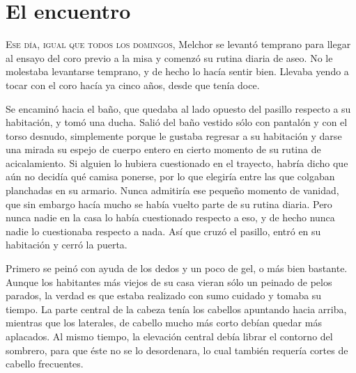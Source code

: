 

\chapter{El encuentro}
\lettrine{E}{se día, igual que todos los domingos,} Melchor se levantó temprano para llegar al ensayo del coro previo a la misa y comenzó su rutina diaria de aseo. No le molestaba levantarse temprano, y de hecho lo hacía sentir bien.
Llevaba yendo a tocar con el coro hacía ya cinco años, desde que tenía doce.

Se encaminó hacia el baño, que quedaba al lado opuesto del pasillo respecto a su habitación, y tomó una ducha. Salió del baño vestido sólo con pantalón y con el torso desnudo, simplemente porque le gustaba regresar a su habitación y darse una mirada su espejo de cuerpo entero
en cierto momento de su rutina de acicalamiento.
Si alguien lo hubiera cuestionado en el trayecto, habría dicho que aún no decidía qué camisa ponerse, por lo que elegiría entre las que colgaban planchadas en su armario. Nunca admitiría ese pequeño momento de vanidad, que sin embargo hacía mucho se había vuelto parte de su rutina diaria. Pero nunca nadie en la casa lo había
cuestionado respecto a eso, y de hecho nunca nadie lo cuestionaba respecto a nada.
Así que cruzó el pasillo, entró en su habitación y cerró la puerta.

Primero se peinó con ayuda de los dedos y un poco de gel, o más bien bastante.
Aunque los habitantes más viejos de su casa vieran sólo un peinado de pelos parados,
la verdad es que estaba realizado con sumo cuidado y tomaba su tiempo.
La parte central de la cabeza tenía los cabellos apuntando hacia arriba, mientras que los
laterales, de cabello mucho más corto debían quedar más aplacados.
Al mismo tiempo, la elevación central debía librar el contorno del sombrero, para que éste no
se lo desordenara, lo cual también requería cortes de cabello frecuentes.

